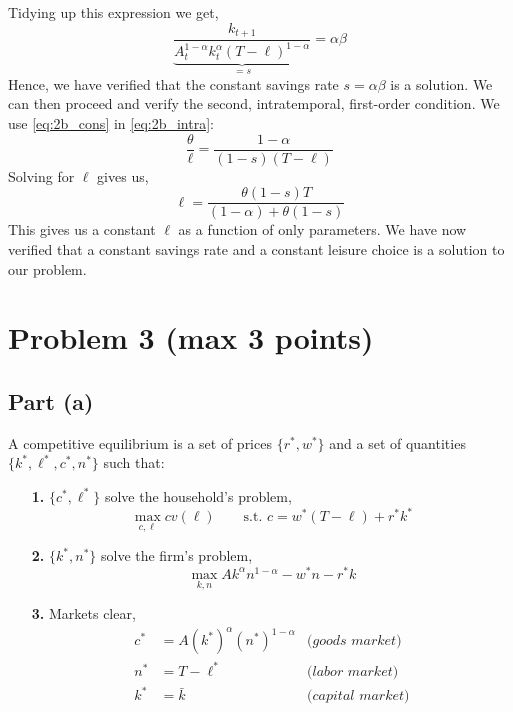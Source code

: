 \documentclass{scrartcl}
\begin{document}
Tidying up this expression we get, 
\begin{equation*}
	\underbrace{\frac{k_{t+1}}{A_t^{1-\alpha} k_t^{\alpha} (T-\ell)^{1-\alpha}}}_{=s} = \alpha \beta
\end{equation*}
Hence, we have verified that the constant savings rate $s=\alpha \beta$ is a solution. We can then proceed and verify the second, intratemporal, first-order condition. We use \eqref{eq:2b_cons} in \eqref{eq:2b_intra}:
\begin{equation*}
	\frac{\theta}{\ell} = \frac{1-\alpha}{(1-s)(T-\ell)}
\end{equation*}
Solving for $\ell$ gives us,
\begin{equation*}
	\ell = \frac{\theta(1-s)T}{(1-\alpha) + \theta(1-s)}
\end{equation*}
This gives us a constant $\ell$ as a function of only parameters. We have now verified that a constant savings rate and a constant leisure choice is a solution to our problem. 
\section*{Problem 3 (max 3 points)}

\subsection*{Part (a)}
A competitive equilibrium is a set of prices $\{r^*, w^*\}$ and a set of quantities $\{k^*, \ell^*, c^*, n^*\}$ such that: 
\begin{enumerate}
	\item[\textbf{1.}] $\{c^*, \ell^*\}$ solve the household's problem, 
	\[
		\max_{c, \ell} cv(\ell) \qquad \text{s.t. } c = w^*(T-\ell) + r^*k^*	
	\]
	\item[\textbf{2.}] $\{k^*, n^*\}$ solve the firm's problem, 
	\[
		\max_{k, n} Ak^\alpha n^{1-\alpha} - w^*n - r^*k
	\]
	\item[\textbf{3.}] Markets clear,  
	\begin{align*}
		c^* &= A(k^*)^\alpha (n^*)^{1-\alpha} & \textit{(goods market)} \\
		n^* &= T - \ell^* & \textit{(labor market)} \\
		k^* &= \bar{k} & \textit{(capital market)}
	\end{align*}
\end{enumerate}
\end{document}
